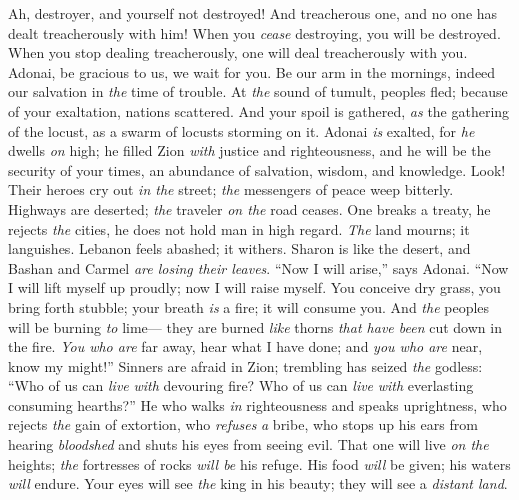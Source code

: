 \begin{biblechapter} %
 Ah, destroyer, and yourself not destroyed! 
And treacherous one, and no one has dealt treacherously with him! 
When you \textit{cease} destroying, you will be destroyed. 
When you stop dealing treacherously, one will deal treacherously with you.
\verse Adonai, be gracious to us, we wait for you. 
Be our arm in the mornings, 
indeed our salvation in \textit{the} time of trouble.
\verse At \textit{the} sound of tumult, peoples fled; 
because of your exaltation, nations scattered.
\verse And your spoil is gathered, 
\textit{as} the gathering of the locust, 
as a swarm of locusts storming on it.
\verse Adonai \textit{is} exalted, for \textit{he} dwells \textit{on} high; 
he filled Zion \textit{with} justice and righteousness,
\verse and he will be the security of your times, 
an abundance of salvation, wisdom, and knowledge.
\verse Look! Their heroes cry out \textit{in the} street; 
\textit{the} messengers of peace weep bitterly.
\verse Highways are deserted; 
\textit{the} traveler \textit{on the} road ceases. 
One breaks a treaty, 
he rejects \textit{the} cities, 
he does not hold man in high regard.
\verse \textit{The} land mourns; it languishes. 
Lebanon feels abashed; it withers. 
Sharon is like the desert, 
and Bashan and Carmel \textit{are losing their leaves}.
\verse “Now I will arise,” says Adonai. 
“Now I will lift myself up proudly; 
now I will raise myself.
\verse You conceive dry grass, you bring forth stubble; 
your breath \textit{is} a fire; it will consume you.
\verse And \textit{the} peoples will be burning \textit{to} lime— 
they are burned \textit{like} thorns \textit{that have been} cut down in the fire.
\verse \textit{You who are} far away, hear what I have done; 
and \textit{you who are} near, know my might!”
\verse Sinners are afraid in Zion; 
trembling has seized \textit{the} godless: 
“Who of us can \textit{live} \textit{with} devouring fire? 
Who of us can \textit{live} \textit{with} everlasting consuming hearths?”
\verse He who walks \textit{in} righteousness 
and speaks uprightness, 
who rejects \textit{the} gain of extortion, 
who \textit{refuses} \textit{a} bribe, 
who stops up his ears from hearing \textit{bloodshed} 
and shuts his eyes from seeing evil.
\verse That one will live \textit{on the} heights; 
\textit{the} fortresses of rocks \textit{will be} his refuge. 
His food \textit{will} be given; 
his waters \textit{will} endure.
\verse Your eyes will see \textit{the} king in his beauty; 
they will see a \textit{distant land}.

\end{biblechapter}

